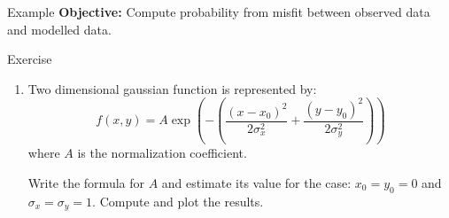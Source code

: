 \documentclass[11pt,titlepage,fleqn]{article}
\begin{document}
\begin{section}{Example}
{\bf Objective:} Compute probability from misfit between observed data and modelled data. 

\end{section}

\begin{section}{Exercise}

\begin{enumerate}

\item Two dimensional gaussian function is represented by:
\begin{equation}
f(x,y) = A \exp \left( - \left ( \frac{(x - x_0)^2}{2\sigma^2_x} + \frac{(y - y_0)^2}{2\sigma^2_y} \right ) \right )
\end{equation}
where $A$ is the normalization coefficient.

Write the formula for $A$ and estimate its value for the case: $x_0 = y_0 = 0$ and $\sigma_x = \sigma_y = 1$. Compute and plot the results.
\end{enumerate}
\end{section}



\end{document}

